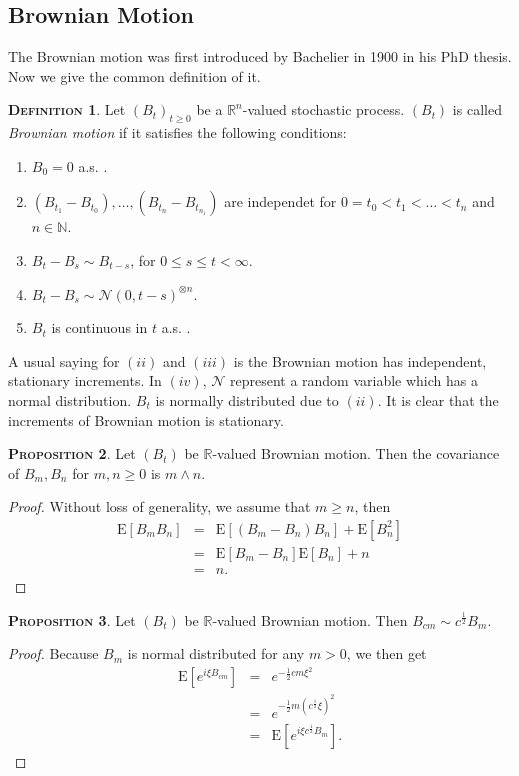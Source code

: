 \documentclass[a4paper, twoside, 11pt]{article}
\theoremstyle{definition}
\newtheorem{definition}{\scshape Definition}[section]
\newtheorem{proposition}[definition]{\scshape Proposition}
\begin{document}
\subsection{Brownian Motion}
The Brownian motion was first introduced by Bachelier in 1900 in his PhD thesis. Now we give the common definition of it.
\begin{definition}
Let $(B_t)_{t\ge0}$ be a $\mathbb{R}^{n}$-valued stochastic process. $(B_t)$ is called \emph{Brownian motion} if it satisfies the following conditions:
\begin{enumerate}[topsep=0pt, itemsep=-1ex, partopsep=1ex, parsep=1ex, label=(\roman*)]
  \item $B_0 = 0 $ a.s. .
  \item $(B_{t_1} - B_{t_0}),\dots,(B_{t_n} - B_{t_{n_1}})$ are independet for $0=t_0<t_1<\dots<t_n$ and $n \in \mathbb{N}$.
  \item $B_t - B_s \sim B_{t-s}$, for $0 \le s \le t < \infty$.
  \item $B_t - B_s \sim \mathcal{N}(0, t-s)^{\otimes n}$.
  \item $B_t$ is continuous in $t$ a.s. .
\end{enumerate}
\end{definition}
A usual saying for $(ii)$ and $(iii)$ is the Brownian motion has independent, stationary increments. In $(iv)$, $\mathcal{N}$ represent a random variable which has a normal distribution. $B_t$ is normally distributed due to $(ii)$. It is clear that the increments of Brownian motion is stationary.

\begin{proposition}
  Let $(B_t)$ be $\mathbb{R}$-valued Brownian motion. Then the covariance of $B_m, B_n$ for $m, n \ge 0$ is $m \wedge n $.
\end{proposition}
\begin{proof}
  Without loss of generality, we assume that $m \ge n$, then
  \begin{eqnarray*}
	\mathrm{E}[B_mB_n] &=& \mathrm{E}[(B_m - B_n)B_n] + \mathrm{E}[B_n^2]\\
	&=& \mathrm{E}[B_m - B_n]\mathrm{E}[B_n] + n\\
	&=& n .
  \end{eqnarray*}
  \label{sec:cor}
\end{proof}

\begin{proposition}
  Let $(B_t)$ be  $\mathbb{R}$-valued Brownian motion. Then $B_{cm} \sim c^{\frac{1}{2}}B_m$.
\end{proposition}
\begin{proof}
  Because $B_m$ is normal distributed for any $m > 0$, we then get
  \begin{eqnarray*}
	\mathrm{E} [e^{i\xi B_{cm}}] &=& e^{-\frac{1}{2}cm\xi^2}\\
	&=& e^{-\frac{1}{2}m(c^{\frac{1}{2}}\xi)^2}\\
	&=& \mathrm{E} [e^{i\xi c^{\frac{1}{2}}B_m}] .
  \end{eqnarray*}
\end{proof}
\end{document}
